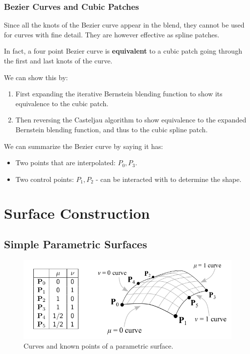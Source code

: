 \documentclass[11pt]{article}
\begin{document}
\subsubsection{Bezier Curves and Cubic Patches}
Since all the knots of the Bezier curve appear in the blend, they cannot be used for curves with fine detail.
They are however effective as spline patches.

In fact, a four point Bezier curve is \textbf{equivalent} to a cubic patch going through the first and last knots of the curve.

We can show this by:
\begin{enumerate}
  \item First expanding the iterative Bernstein blending function to show its equivalence to the cubic patch.
  \item Then reversing the Casteljau algorithm to show equivalence to the expanded Bernstein blending function, and thus to the cubic spline patch.
\end{enumerate}

We can summarize the Bezier curve by saying it has:
\begin{itemize}
  \item Two points that are interpolated: $P_0, P_3$.
  \item Two control points: $P_1, P_2$ - can be interacted with to determine the shape.
\end{itemize}

\section{Surface Construction}
\subsection{Simple Parametric Surfaces}
\begin{figure}[htb!]
  \centering
  \caption{Curves and known points of a parametric surface.}
  \includegraphics[scale=0.5]{parametricsurface}
\end{figure}
\end{document}
